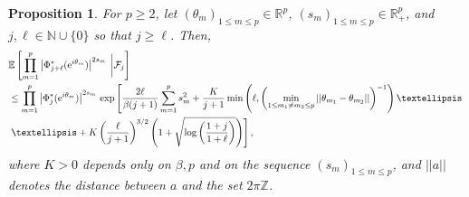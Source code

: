 \documentclass[10pt,a4paper]{amsart}
\newtheorem{prop}{Proposition}
\begin{document}
\begin{prop} \label{boundconditionalmoment}
For $p \geq 2$, let $(\theta_m)_{1 \leq m \leq p}\in \mathbb{R}^p$, $(s_m)_{1 \leq m \leq p}\in\mathbb{R}_+^p$, 
and $j,\ell \in \mathbb{N}\cup \{0\}$ so that $j \geq \ell$.  
Then, 
\begin{align*}
& \mathbb{E} \left[ \prod_{m=1}^p \left|\Phi^*_{j+\ell} (\mathrm{e}^{\textnormal{i} \theta_m})
\right|^{2s_m} \;  \bigg| \mathcal{F}_j \right]
\\ & \leq \prod_{m=1}^p \left|\Phi^*_{j} (\mathrm{e}^{\textnormal{i} \theta_m})
\right|^{2s_m} \, \exp \left[ 
\frac{2 \ell}{\beta (j+1)}  
 \sum_{m=1}^{p} s_m^2 
+ \frac{K}{j+1} \min \left( \ell, \left(\min_{1 \leq m_1 \neq m_2 \leq p} 
||\theta_{m_1} - \theta_{m_2}|| \right)^{-1} \right)  \dots \right.
\\ & \left.  \dots
+ K \left(\frac{\ell}{j+1} \right)^{3/2}    \left(1 + \sqrt{\log \left(\frac{1+j}{1 + \ell} \right) } \right)   
\right],
\end{align*}
where $K > 0$ depends only on $\beta, p$
and on the sequence $(s_m)_{1 \leq m \leq p}$, and $||a||$ denotes the distance between $a$ and the set $2 \pi \mathbb{Z}$. 
\end{prop}
\end{document}
